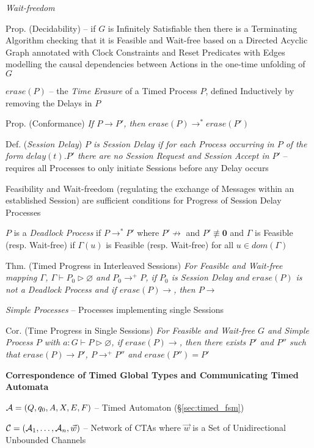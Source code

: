 \emph{Wait-freedom} %

Prop. (Decidability) -- if $G$ is Infinitely Satisfiable then there is
a Terminating Algorithm checking that it is Feasible and Wait-free
based on a Directed Acyclic Graph annotated with Clock Constraints and
Reset Predicates with Edges modelling the causal dependencies between
Actions in the one-time unfolding of $G$

$erase(P)$ -- the \emph{Time Erasure} of a Timed Process $P$, defined
Inductively by removing the Delays in $P$

Prop. (Conformance) \emph{If $P \rightarrow P'$, then $erase(P)
  \rightarrow^* erase(P')$}

Def. (\emph{Session Delay}) \emph{$P$ is Session Delay if for each
  Process occurring in $P$ of the form $delay(t).P'$ there are no
  Session Request and Session Accept in $P'$} -- requires all
Processes to only initiate Sessions before any Delay occurs

Feasibility and Wait-freedom (regulating the exchange of Messages
within an established Session) are sufficient conditions for Progress
of Session Delay Processes

$P$ is a \emph{Deadlock Process} if $P \rightarrow^* P'$ where $P'
\not\rightarrow$ and $P' \not\equiv \mathbf{0}$ and $\Gamma$ is
Feasible (resp. Wait-free) if $\Gamma(u)$ is Feasible (resp.
Wait-free) for all $u \in dom(\Gamma)$

Thm. (Timed Progress in Interleaved Sessions) \emph{For Feasible and
  Wait-free mapping $\Gamma$, $\Gamma \vdash P_0 \rhd \varnothing$ and
  $P_0 \rightarrow^+ P$, if $P_0$ is Session Delay and $erase(P)$ is
  not a Deadlock Process and if $erase(P)\rightarrow$, then
  $P\rightarrow$}

\emph{Simple Processes} -- Processes implementing single Sessions

Cor. (Time Progress in Single Sessions) \emph{For Feasible and
  Wait-free $G$ and Simple Process $P$ with $a : G \vdash P \rhd
  \varnothing$, if $erase(P) \rightarrow$, then there exists $P'$ and
  $P''$ such that $erase(P) \rightarrow P'$, $P \rightarrow^+ P''$ and
  $erase(P'') = P'$}


\textbf{Correspondence of Timed Global Types and Communicating Timed
  Automata}

$\mathcal{A} = (Q,q_0,A,X,E,F)$ -- Timed Automaton
(\S\ref{sec:timed_fsm})

$\mathcal{C} = (\mathcal{A}_1,\ldots,\mathcal{A}_n,\vec{w})$ -- Network of
CTAs where $\vec{w}$ is a Set of Unidirectional Unbounded Channels


